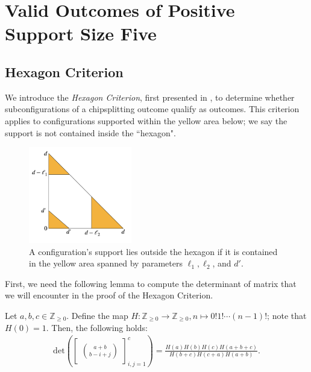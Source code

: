 \chapter{Valid Outcomes of Positive Support Size Five}

\section{Hexagon Criterion}

We introduce the \emph{Hexagon Criterion}, first presented in \cite{bik2022classifying}, to determine whether subconfigurations of a chipsplitting outcome qualify as outcomes. This criterion applies to configurations supported within the yellow area below; we say the support is not contained inside the ``hexagon".

\begin{figure}[H]
    \centering
    \includegraphics[width=0.4\textwidth]{assets/hexagon.png}
    \caption{A configuration's support lies outside the hexagon if it is contained in the yellow area spanned by parameters \( \ell_1, \ell_2 \), and \( d' \).}     \label{fig:hexagon}
\end{figure}

First, we need the following lemma to compute the determinant of matrix that we will encounter in the proof of the Hexagon Criterion.

\begin{lemma}\label{lemma:grinberghyperfactorial}
    Let \( a,b,c \in \mathbb{Z}_{\geq 0} \). Define the map \( H:  \mathbb{Z}_{\geq 0} \to  \mathbb{Z}_{\geq 0}, n \mapsto 0! 1! \cdots (n-1)! \); note that \( H(0) = 1 \). Then, the following holds:
    \begin{align*}
        \mathrm{det}\left(\begin{bmatrix}
            \binom{a+b}{b-i+j}
        \end{bmatrix}_{i,j = 1}^c\right) = \frac{H(a)H(b)H(c)H(a+b+c)}{H(b+c)H(c+a)H(a+b)}.
    \end{align*} 
\end{lemma}

